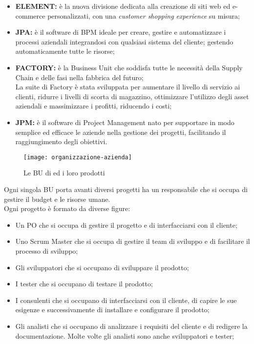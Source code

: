 \begin{itemize}
  \item \textbf{ELEMENT:} è la nuova divisione dedicata alla creazione di siti web ed e-commerce personalizzati, con una \textit{customer shopping experience} su misura;
  \item \textbf{JPA:} è il software di \gls{BPM} ideale per creare, gestire e automatizzare i processi aziendali integrandosi con qualsiasi sistema del cliente; gestendo automaticamente tutte le risorse;
  \item \textbf{FACTORY:} è la Business Unit che soddisfa tutte le necessità della \gls{Supply Chain} e delle fasi nella fabbrica del futuro;\\
  La suite di Factory è stata sviluppata per aumentare il livello di servizio ai clienti, ridurre i livelli di scorta di magazzino, ottimizzare l’utilizzo degli asset aziendali e massimizzare i profitti, riducendo i costi;
  \item \textbf{JPM:} è il software di \gls{Project Management} nato per supportare in modo semplice ed efficace le aziende nella gestione dei progetti, facilitando il raggiungimento degli obiettivi.

\end{itemize}


\begin{figure}[!h] 
  \centering 
  \texttt{[image: organizzazione-azienda]} 
  \caption{Le BU di {\azienda} ed i loro prodotti}
  \label{fig:organizzazione-azienda}
\end{figure}

\noindent Ogni singola BU porta avanti diversi progetti ha un responsabile che si occupa di gestire il budget e le risorse umane. \\
Ogni progetto è formato da diverse figure:
\begin{itemize}
  \item Un \gls{PO} che si occupa di gestire il progetto e di interfacciarsi con il cliente;
  \item Uno \gls{Scrum Master} che si occupa di gestire il team di sviluppo e di facilitare il processo di sviluppo;
  \item Gli sviluppatori che si occupano di sviluppare il prodotto;
  \item I tester che si occupano di testare il prodotto;
  \item I consulenti che si occupano di interfacciarsi con il cliente, di capire le sue esigenze e successivamente di installare e configurare il prodotto;
  \item Gli \gls{analisti} che si occupano di analizzare i requisiti del cliente e di redigere la documentazione. Molte volte gli analisti sono anche sviluppatori e tester;
\end{itemize}

